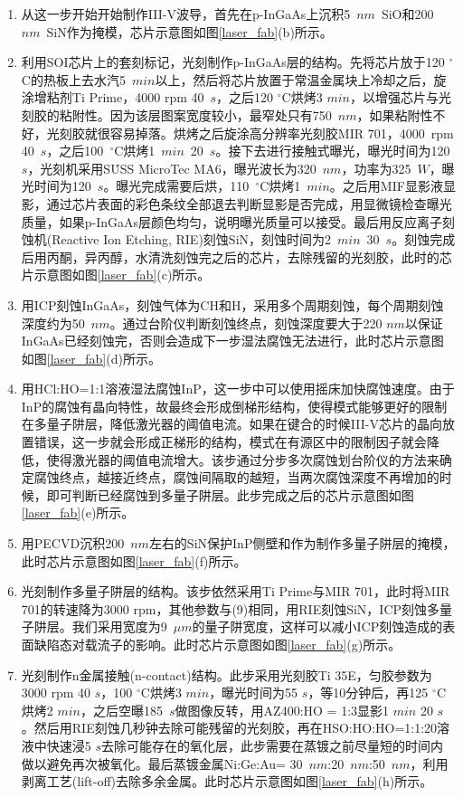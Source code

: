 \begin{enumerate}[(1)]
	\item 
	从这一步开始开始制作III-V波导，首先在p-InGaAs上沉积5~$nm$~SiO和200~$nm$~SiN作为掩模，芯片示意图如图\ref{laser_fab}(b)所示。
	\item 
	利用SOI芯片上的套刻标记，光刻制作p-InGaAs层的结构。先将芯片放于120 $^{\circ}$C的热板上去水汽5~$min$以上，然后将芯片放置于常温金属块上冷却之后，旋涂增粘剂Ti Prime，4000 rpm 40~$s$，之后120 $^{\circ}$C烘烤3 $min$，以增强芯片与光刻胶的粘附性。因为该层图案宽度较小，最窄处只有750~$nm$，如果粘附性不好，光刻胶就很容易掉落。烘烤之后旋涂高分辨率光刻胶MIR 701，4000~rpm 40~$s$，之后100~$^{\circ}$C烘烤1~$min$~20~$s$。接下去进行接触式曝光，曝光时间为120 $s$，光刻机采用S\.{U}SS MicroTec MA6，曝光波长为320~$nm$，功率为325~$W$，曝光时间为120~$s$。曝光完成需要后烘，110~$^{\circ}$C烘烤1~$min$。之后用MIF显影液显影，通过芯片表面的彩色条纹全部退去判断显影是否完成，用显微镜检查曝光质量，如果p-InGaAs层颜色均匀，说明曝光质量可以接受。最后用反应离子刻蚀机(Reactive Ion Etching, RIE)刻蚀SiN，刻蚀时间为2~$min$~30~$s$。刻蚀完成后用丙酮，异丙醇，水清洗刻蚀完之后的芯片，去除残留的光刻胶，此时的芯片示意图如图\ref{laser_fab}(c)所示。
	\item 
	用ICP刻蚀InGaAs，刻蚀气体为CH和H，采用多个周期刻蚀，每个周期刻蚀深度约为50~$nm$。通过台阶仪判断刻蚀终点，刻蚀深度要大于220 $nm$以保证InGaAs已经刻蚀完，否则会造成下一步湿法腐蚀无法进行，此时芯片示意图如图\ref{laser_fab}(d)所示。
	\item
	用HCl:HO=1:1溶液湿法腐蚀InP，这一步中可以使用摇床加快腐蚀速度。由于InP的腐蚀有晶向特性，故最终会形成倒梯形结构，使得模式能够更好的限制在多量子阱层，降低激光器的阈值电流。如果在键合的时候III-V芯片的晶向放置错误，这一步就会形成正梯形的结构，模式在有源区中的限制因子就会降低，使得激光器的阈值电流增大。该步通过分步多次腐蚀划台阶仪的方法来确定腐蚀终点，越接近终点，腐蚀间隔取的越短，当两次腐蚀深度不再增加的时候，即可判断已经腐蚀到多量子阱层。此步完成之后的芯片示意图如图\ref{laser_fab}(e)所示。
	\item 
	用PECVD沉积200~$nm$左右的SiN保护InP侧壁和作为制作多量子阱层的掩模，此时芯片示意图如图\ref{laser_fab}(f)所示。
	\item 
	光刻制作多量子阱层的结构。该步依然采用Ti Prime与MIR 701，此时将MIR 701的转速降为3000 rpm，其他参数与(9)相同，用RIE刻蚀SiN，ICP刻蚀多量子阱层。我们采用宽度为9~$\mu m$的量子阱宽度，这样可以减小ICP刻蚀造成的表面缺陷态对载流子的影响。此时芯片示意图如图\ref{laser_fab}(g)所示。
	\item 
	光刻制作n金属接触(n-contact)结构。此步采用光刻胶Ti 35E，匀胶参数为3000 rpm 40 $s$，100 $^{\circ}$C烘烤3 $min$，曝光时间为55 $s$，等10分钟后，再125 $^{\circ}$C烘烤2 $min$，之后空曝185~$s$做图像反转，用AZ400:HO = 1:3显影1 $min$ 20 $s$。然后用RIE刻蚀几秒钟去除可能残留的光刻胶，再在HSO:HO:HO=1:1:20溶液中快速浸5 $s$去除可能存在的氧化层，此步需要在蒸镀之前尽量短的时间内做以避免再次被氧化。最后蒸镀金属Ni:Ge:Au= 30~$nm$:20~$nm$:50~$nm$，利用剥离工艺(lift-off)去除多余金属。此时芯片示意图如图\ref{laser_fab}(h)所示。

\end{enumerate}
